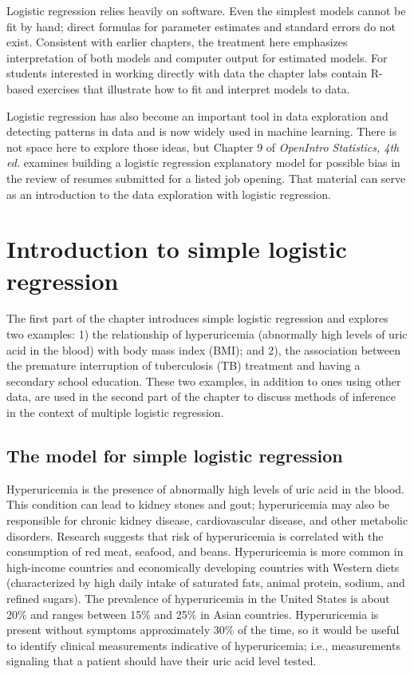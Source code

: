 Logistic regression relies heavily on software.  Even the simplest models cannot be fit by hand; direct formulas for parameter estimates and standard errors do not exist.  Consistent with earlier chapters, the treatment here emphasizes interpretation of both models and computer output for estimated models.  For students interested in working directly with data the chapter labs contain \textsf{R}-based exercises that illustrate how to fit and interpret models to data.

Logistic regression has also become an important tool in data exploration and detecting patterns in data and is now widely used in machine learning.  There is not space here to explore those ideas, but Chapter 9 of \textit{OpenIntro Statistics, 4th ed.} examines building a logistic regression explanatory model for possible bias in the review of resumes submitted for a listed job opening.  That material can serve as an introduction to the data exploration with logistic regression.

\section{Introduction to simple logistic regression}
\label{introSimpleLogisticRegression}
The first part of the chapter introduces simple logistic regression and explores two examples: 1) the relationship of hyperuricemia (abnormally high levels of uric acid in the blood) with body mass index (BMI); and 2), the association between the premature interruption of tuberculosis (TB) treatment and having a secondary school education. These two examples, in addition to ones using other data, are used in the second part of the chapter to discuss methods of inference in the context of multiple logistic regression.


\subsection{The model for simple logistic regression}

Hyperuricemia is the presence of abnormally high levels of uric acid in the blood.  This condition can lead to kidney stones and gout; hyperuricemia may also be responsible for chronic kidney disease, cardiovascular disease, and other metabolic disorders. Research suggests that risk of hyperuricemia is correlated with the consumption of red meat, seafood, and beans. Hyperuricemia is more common in high-income countries and economically developing countries with Western diets (characterized by high daily intake of saturated fats, animal protein, sodium, and refined sugars). The prevalence of hyperuricemia in the United States is about 20\% and ranges between 15\% and 25\% in Asian countries.  Hyperuricemia is present without symptoms approximately 30\% of the time, so it would be useful to identify clinical measurements indicative of hyperuricemia; i.e., measurements signaling that a patient should have their uric acid level tested.



